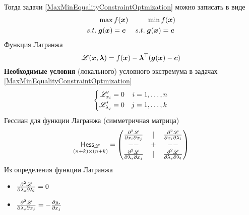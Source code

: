 Тогда задачи \eqref{MaxMinEqualityConstraintOptmization} можно записать в виде
\begin{align*}
	&\max f({\bm x}) & &\min f({\bm x}) \\
	s.t.\;&{\bm g}({\bm x})= {\bm c}  &
	s.t.\;&{\bm g}({\bm x})= {\bm c} 
\end{align*}
Функция Лагранжа
\[
	{\mathscr L}({\bm x},{\bm{ \lambda}})=f({\bm x})-
	{\bm{ \lambda}}^\top({\bm g}({\bm x})-{\bm c})
\]
\textbf{Необходимые условия} (локального) условного экстремума 
в задачах \eqref{MaxMinEqualityConstraintOptmization}
\[
	\left\{\begin{aligned}
		{\mathscr L}'_{x_i}&=0 & i&=1,\ldots,n\\
		{\mathscr L}'_{\lambda_j}&=0  & j&=1,\ldots,k
	\end{aligned}\right.
\]
Гессиан для функции Лагранжа (симметричная матрица)
\begin{equation}\label{BorderedHessian}
	\underset{(n+k)\times(n+k)}{\mathsf{Hess}_{\mathscr L}}=\begin{pmatrix}
		\frac{\partial^2 {\mathscr L}}{\partial x_i\partial x_j} & | &\frac{\partial^2 {\mathscr L}}{\partial x_i\partial \lambda_l} \\
		-- & + & -- \\
		\frac{\partial^2 {\mathscr L}}{\partial \lambda_s\partial x_j} & | &
		\frac{\partial^2 {\mathscr L}}{\partial \lambda_s\partial \lambda_l}
   \end{pmatrix}
\end{equation}
Из определения функции Лагранжа
\begin{itemize}
	\item \(\frac{\partial^2 {\mathscr L}}{\partial \lambda_s\partial \lambda_l}=0\)
	\item \(\frac{\partial^2 {\mathscr L}}{\partial \lambda_s\partial x_j}=-\frac{\partial g_s}{\partial x_j}\)
\end{itemize}
